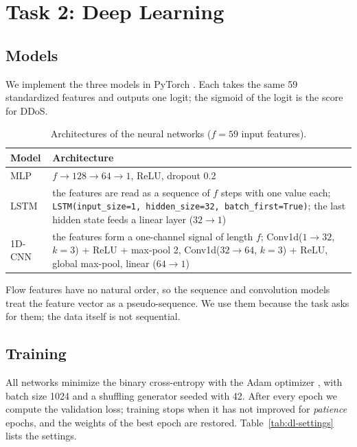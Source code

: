 \chapter{Task 2: Deep Learning}\label{chap:task2}

\section{Models}
We implement the three models in PyTorch \cite{pytorch}. Each takes the same 59 standardized features and outputs one logit; the sigmoid of the logit is the score for DDoS.

\begin{table}[htb]
\centering
\caption{Architectures of the neural networks ($f=59$ input features).}\label{tab:arch}
\begin{tabular}{lp{12cm}}
\toprule
Model & Architecture \\
\midrule
MLP & $f \to 128 \to 64 \to 1$, ReLU, dropout 0.2 \\
LSTM \cite{lstm} & the features are read as a sequence of $f$ steps with one value each; \texttt{LSTM(input\_size=1, hidden\_size=32, batch\_first=True)}; the last hidden state feeds a linear layer ($32 \to 1$) \\
1D-CNN & the features form a one-channel signal of length $f$; Conv1d($1 \to 32$, $k=3$) + ReLU + max-pool 2, Conv1d($32 \to 64$, $k=3$) + ReLU, global max-pool, linear ($64 \to 1$) \\
\bottomrule
\end{tabular}
\end{table}

Flow features have no natural order, so the sequence and convolution models treat the feature vector as a pseudo-sequence. We use them because the task asks for them; the data itself is not sequential.

\section{Training}
All networks minimize the binary cross-entropy with the Adam optimizer \cite{adam}, with batch size 1024 and a shuffling generator seeded with 42. After every epoch we compute the validation loss; training stops when it has not improved for \emph{patience} epochs, and the weights of the best epoch are restored. Table~\ref{tab:dl-settings} lists the settings.


